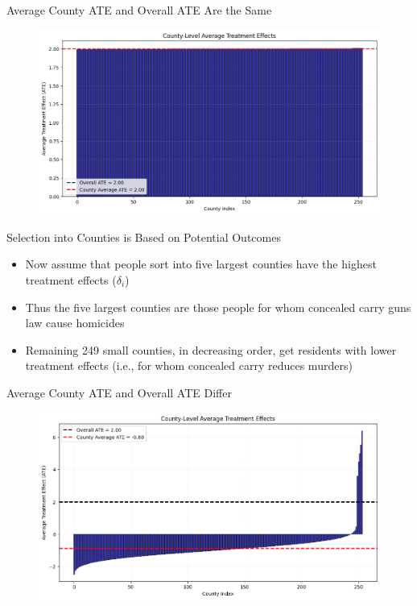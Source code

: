 \documentclass{beamer}
\begin{document}
\begin{frame}{Average County ATE and Overall ATE Are the Same }

\begin{figure}
    \centering
    \includegraphics[height=0.7\textheight]{./lecture_includes/tiebout_roy1}
\end{figure}

\end{frame}

\begin{frame}{Selection into Counties is Based on Potential Outcomes}

\begin{itemize}
\item Now assume that people sort into five largest counties have the highest treatment effects ($\delta_i$)
\item Thus the five largest counties are those people for whom concealed carry guns law cause homicides
\item Remaining 249 small counties, in decreasing order, get residents with lower treatment effects (i.e., for whom concealed carry reduces murders)
\end{itemize}

\end{frame}

\begin{frame}{Average County ATE and Overall ATE Differ }

\begin{figure}
    \centering
    \includegraphics[height=0.7\textheight]{./lecture_includes/tiebout_roy2}
\end{figure}

\end{frame}
\end{document}
